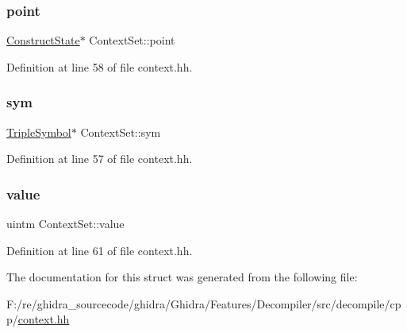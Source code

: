 \subsubsection{\texorpdfstring{point}{point}}
{\footnotesize\ttfamily \mbox{\hyperlink{struct_construct_state}{Construct\+State}}$\ast$ Context\+Set\+::point}



Definition at line 58 of file context.\+hh.

\mbox{\label{struct_context_set_a4f5c531c6158b0937843596a9442fdc5}} 
\subsubsection{\texorpdfstring{sym}{sym}}
{\footnotesize\ttfamily \mbox{\hyperlink{class_triple_symbol}{Triple\+Symbol}}$\ast$ Context\+Set\+::sym}



Definition at line 57 of file context.\+hh.

\mbox{\label{struct_context_set_a01757eacad380f2c8b6c008af4ce2538}} 
\subsubsection{\texorpdfstring{value}{value}}
{\footnotesize\ttfamily uintm Context\+Set\+::value}



Definition at line 61 of file context.\+hh.



The documentation for this struct was generated from the following file\+:\begin{DoxyCompactItemize}
\item 
F\+:/re/ghidra\+\_\+sourcecode/ghidra/\+Ghidra/\+Features/\+Decompiler/src/decompile/cpp/\mbox{\hyperlink{context_8hh}{context.\+hh}}\end{DoxyCompactItemize}
